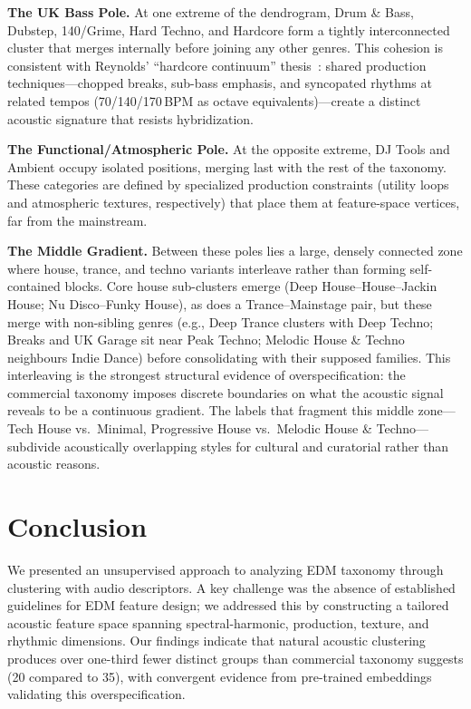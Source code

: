 \documentclass{article}
\begin{document}
	\textbf{The UK Bass Pole.} At one extreme of the dendrogram, Drum \& Bass, Dubstep, 140/Grime, Hard Techno, and Hardcore form a tightly interconnected cluster that merges internally before joining any other genres. This cohesion is consistent with Reynolds' ``hardcore continuum'' thesis~\cite{reynolds2013energy}: shared production techniques---chopped breaks, sub-bass emphasis, and syncopated rhythms at related tempos (70/140/170\,BPM as octave equivalents)---create a distinct acoustic signature that resists hybridization.

	\textbf{The Functional/Atmospheric Pole.} At the opposite extreme, DJ Tools and Ambient occupy isolated positions, merging last with the rest of the taxonomy. These categories are defined by specialized production constraints (utility loops and atmospheric textures, respectively) that place them at feature-space vertices, far from the mainstream.

	\textbf{The Middle Gradient.} Between these poles lies a large, densely connected zone where house, trance, and techno variants interleave rather than forming self-contained blocks. Core house sub-clusters emerge (Deep House--House--Jackin House; Nu Disco--Funky House), as does a Trance--Mainstage pair, but these merge with non-sibling genres (e.g., Deep Trance clusters with Deep Techno; Breaks and UK Garage sit near Peak Techno; Melodic House \& Techno neighbours Indie Dance) before consolidating with their supposed families. This interleaving is the strongest structural evidence of overspecification: the commercial taxonomy imposes discrete boundaries on what the acoustic signal reveals to be a continuous gradient. The labels that fragment this middle zone---Tech House vs.\ Minimal, Progressive House vs.\ Melodic House \& Techno---subdivide acoustically overlapping styles for cultural and curatorial rather than acoustic reasons.





	\section{Conclusion}\label{sec:conclusion}
	We presented an unsupervised approach to analyzing EDM taxonomy through clustering with audio descriptors. A key challenge was the absence of established guidelines for EDM feature design; we addressed this by constructing a tailored acoustic feature space spanning spectral-harmonic, production, texture, and rhythmic dimensions. Our findings indicate that natural acoustic clustering produces over one-third fewer distinct groups than commercial taxonomy suggests (20 compared to 35), with convergent evidence from pre-trained embeddings validating this overspecification.
\end{document}

